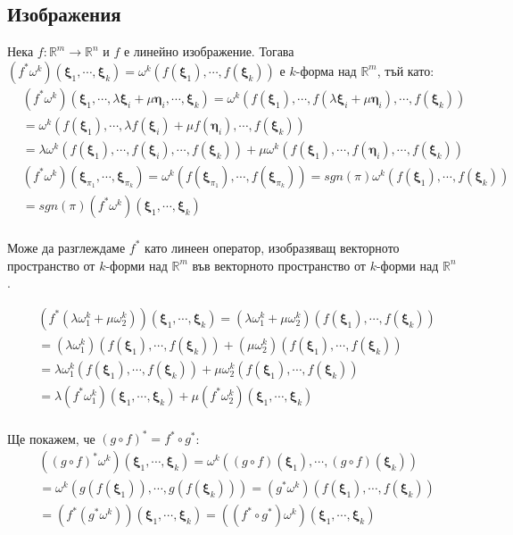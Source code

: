 \documentclass[12pt]{article}
\newcommand\func[3]{#1:#2 \to #3}
\newcommand\myxi[0]{\boldsymbol{\xi}}
\newcommand\myeta[0]{\boldsymbol{\eta}}
\begin{document}
\begin{large}
\subsection{Изображения}
Нека $\func{f}{\mathbb{R}^m}{\mathbb{R}^n}$ и $f$ е линейно изображение. Тогава
$(f^*\omega^k)(\myxi_1,\cdots,\myxi_k)=\omega^k(f(\myxi_1),\cdots,f(\myxi_k))$ е $k$-форма над $\mathbb{R}^m$, тъй като:
\begin{align*}
  &(f^* \omega^k)(\myxi_1,\cdots,\lambda\myxi_i+\mu\myeta_i,\cdots,\myxi_k)=\omega^k(f(\myxi_1),\cdots,f(\lambda\myxi_i+\mu\myeta_i),\cdots, f(\myxi_k)) \\
  &=\omega^k(f(\myxi_1),\cdots,\lambda f(\myxi_i)+\mu f(\myeta_i),\cdots, f(\myxi_k)) \\
  &=\lambda\omega^k(f(\myxi_1),\cdots, f(\myxi_i),\cdots, f(\myxi_k))+\mu\omega^k(f(\myxi_1),\cdots, f(\myeta_i),\cdots, f(\myxi_k))\\
  &(f^* \omega^k)(\myxi_{\pi_1},\cdots,\myxi_{\pi_k})=
  \omega^k(f(\myxi_{\pi_1}),\cdots,f(\myxi_{\pi_k}))  =sgn(\pi)\omega^k(f(\myxi_1),\cdots,f(\myxi_k))\\
  &=sgn(\pi)(f^* \omega^k)(\myxi_1,\cdots,\myxi_k) \\
\end{align*}

Може да разглеждаме $f^*$ като линеен оператор, изобразяващ векторното пространство от $k$-форми над $\mathbb{R}^m$ във векторното пространство от $k$-форми над $\mathbb{R}^n$.

\begin{align*}
  &(f^*(\lambda \omega^k_1+\mu\omega^k_2))(\myxi_1,\cdots,\myxi_k)=(\lambda \omega^k_1+\mu\omega^k_2)(f(\myxi_1),\cdots, f(\myxi_k)) \\
  &=(\lambda \omega^k_1)(f(\myxi_1),\cdots, f(\myxi_k)) + (\mu\omega^k_2)(f(\myxi_1),\cdots, f(\myxi_k)) \\
  &=\lambda \omega^k_1(f(\myxi_1),\cdots, f(\myxi_k)) +\mu\omega^k_2(f(\myxi_1),\cdots, f(\myxi_k)) \\
  &=\lambda (f^* \omega^k_1)(\myxi_1,\cdots,\myxi_k)+\mu(f^* \omega^k_2)(\myxi_1,\cdots,\myxi_k)\\
\end{align*}

Ще покажем, че $(g \circ f)^*=f^* \circ g^*$:
\begin{align*}
  &((g \circ f)^*\omega^k)(\myxi_1,\cdots,\myxi_k)=\omega^k((g \circ f)(\myxi_1),\cdots, (g \circ f)(\myxi_k)) \\
  &=\omega^k(g(f(\myxi_1)),\cdots, g(f(\myxi_k)))=(g^*\omega^k)(f(\myxi_1),\cdots, f(\myxi_k)) \\
  &=(f^*(g^*\omega^k))(\myxi_1,\cdots, \myxi_k)= ((f^*\circ g^*)\omega^k)(\myxi_1,\cdots, \myxi_k)\\
\end{align*}


\end{large}
\end{document}
